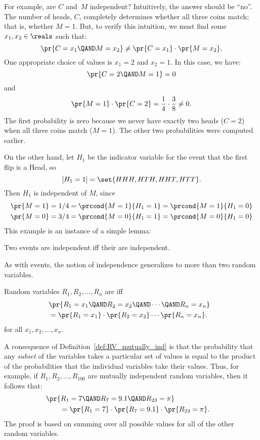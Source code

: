 For example, are $C$ and~$M$ independent?  Intuitively, the answer
should be ``no''.  The number of heads, $C$, completely determines
whether all three coins match; that is, whether $M = 1$.  But, to
verify this intuition, we must find some $x_1, x_2 \in \reals$ such
that:
\[
\pr{C = x_1 \QAND M = x_2} \neq \pr{C = x_1} \cdot \pr{M = x_2}.
\]
One appropriate choice of values is $x_1 = 2$ and $x_2 = 1$.
In this case, we have:
\[
    \pr{C = 2 \QAND M = 1} = 0
\]
and
\begin{equation*}
    \pr{M = 1} \cdot \pr{C = 2} = \frac{1}{4} \cdot \frac{3}{8} \ne 0.
\end{equation*}
The first probability is zero because we never have exactly two heads
($C = 2$) when all three coins match ($M = 1$).  The other two
probabilities were computed earlier.

On the other hand, let $H_1$ be the indicator variable for the event
that the first flip is a Head, so
\[
[H_1 = 1] = \set{HHH, HTH, HHT, HTT}.
\]
Then $H_1$ is independent of $M$, since
\begin{align*}
\pr{M=1} & = 1/4 = \prcond{M=1}{H_1=1} = \prcond{M=1}{H_1=0}\\
\pr{M=0} & = 3/4 = \prcond{M=0}{H_1=1} = \prcond{M=0}{H_1=0}
\end{align*}
This example is an instance of a simple lemma:
\begin{lemma}
  Two events are independent iff their  are
  independent.
\end{lemma}
As with events, the notion of independence generalizes to more than two
random variables.
\begin{definition}\label{def:RV_mutually_ind}
Random variables $R_1, R_2, \dots, R_n$ are  iff
\begin{align*}
\lefteqn{\pr{R_1 = x_1 \QAND R_2 = x_2 \QAND \cdots \QAND R_n = x_n}}\\
        & =  \pr{R_1 = x_1} \cdot \pr{R_2 = x_2} \cdots \pr{R_n = x_n}.
\end{align*}
for all $x_1, x_2, \dots, x_n$.
\end{definition}

A consequence of Definition~\ref{def:RV_mutually_ind} is that the
probability that any \emph{subset} of the variables takes a particular
set of values is equal to the product of the probabilities that the
individual variables take their values.  Thus, for example, if $R_1,
R_2, \dots, R_{100}$ are mutually independent random variables, then
it follows that:
\begin{align*}
\lefteqn{\pr{R_1 = 7 \QAND R_7 = 9.1 \QAND R_{23} = \pi}}\qquad \\
& = \pr{R_1 = 7} \cdot \pr{R_7 = 9.1} \cdot \pr{R_{23} = \pi}.
\end{align*}
The proof is based on summing over all possible values for all of the
other random variables.

